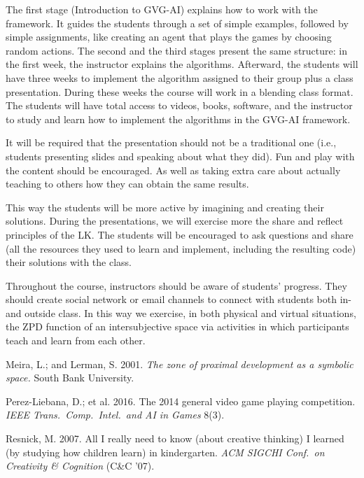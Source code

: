 \documentclass[letterpaper]{article}
\begin{document}
The first stage (Introduction to GVG-AI) explains
how to work with the framework. It guides the students
through a set of simple examples, followed by
simple assignments, like creating an agent that plays
the games by choosing random actions. The second and the third stages present the same
structure: in the first week, the instructor explains the
algorithms. Afterward, the students will have three
weeks to implement the algorithm assigned to their
group plus a class presentation. During these weeks
the course will work in a blending class format. The
students will have total access to videos, books, software, 
and the instructor to study and learn how to implement
the algorithms in the GVG-AI framework.

It will be required that the presentation
should not be a traditional one (i.e.,  students
presenting slides and speaking about what they did). Fun
and play with the content should be encouraged. As
well as taking extra care about actually teaching to others
how they can obtain the same results.

This way the students will be more active by imagining
and creating their solutions. %
During the presentations,
we will exercise more the share and reflect principles of
the LK. The students will be encouraged to ask questions
and share (all the resources they used to learn and
implement, including the resulting code) their solutions
with the class.

Throughout the course, instructors should be aware of students' progress. They should create social network
or email channels to connect with students both 
in- and outside class. In this way we exercise, in
both physical and virtual situations, the ZPD function
of an intersubjective space via activities in
which participants teach and learn from
each other.%

\vspace{0.25em}

{\footnotesize 
{}

\noindent Meira, L.; and Lerman, S. 2001. {\em The zone of proximal development as a symbolic space.} South Bank University.\vspace{0.25em}

\noindent Perez-Liebana, D.; et al. 2016. The 2014 general video game playing competition. {\em IEEE Trans.~Comp.~Intel.~and AI in Games} 8(3).\vspace{0.25em}

\noindent Resnick, M. 2007. All I really need to know (about creative thinking)
I learned (by studying how children learn) in kindergarten. {\em ACM SIGCHI Conf.~on Creativity \& Cognition} (C\&C '07).


}
\end{document}

